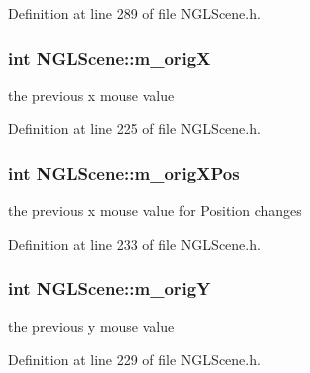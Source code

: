 Definition at line 289 of file N\-G\-L\-Scene.\-h.

\subsubsection[{m\-\_\-orig\-X}]{\setlength{\rightskip}{0pt plus 5cm}int N\-G\-L\-Scene\-::m\-\_\-orig\-X\hspace{0.3cm}{\ttfamily [private]}}\label{class_n_g_l_scene_a645f3969c21294f5c76168bf6d3b9b51}


the previous x mouse value 



Definition at line 225 of file N\-G\-L\-Scene.\-h.

\subsubsection[{m\-\_\-orig\-X\-Pos}]{\setlength{\rightskip}{0pt plus 5cm}int N\-G\-L\-Scene\-::m\-\_\-orig\-X\-Pos\hspace{0.3cm}{\ttfamily [private]}}\label{class_n_g_l_scene_a3a98c0d84c61feb12b2a2ec00270727b}


the previous x mouse value for Position changes 



Definition at line 233 of file N\-G\-L\-Scene.\-h.

\subsubsection[{m\-\_\-orig\-Y}]{\setlength{\rightskip}{0pt plus 5cm}int N\-G\-L\-Scene\-::m\-\_\-orig\-Y\hspace{0.3cm}{\ttfamily [private]}}\label{class_n_g_l_scene_ae3e8e838aeefc97bb241aaaec0769931}


the previous y mouse value 



Definition at line 229 of file N\-G\-L\-Scene.\-h.

